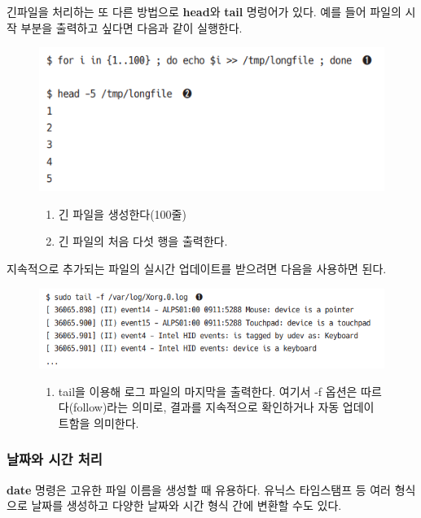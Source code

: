 \begin{flushleft}
    긴파일을 처리하는 또 다른 방법으로 \textbf{head}와 \textbf{tail} 명렁어가 있다.
    예를 들어 파일의 시작 부분을 출력하고 싶다면 다음과 같이 실행한다.
\end{flushleft}

\begin{figure}[h]
    \includegraphics[width=15cm]{resource/3-head-example.png}
    \begin{enumerate}
        \item 긴 파일을 생성한다(100줄)
        \item 긴 파일의 처음 다섯 행을 출력한다.
    \end{enumerate}
\end{figure}

\begin{flushleft}
    지속적으로 추가되는 파일의 실시간 업데이트를 받으려면 다음을 사용하면 된다.
\end{flushleft}

\begin{figure}[h]
    \includegraphics[width=15cm]{resource/3-tail-example.png}
    \begin{enumerate}
        \item tail을 이용해 로그 파일의 마지막을 출력한다.
            여기서 -f 옵션은 따르다(follow)라는 의미로,
            결과를 지속적으로 확인하거나 자동 업데이트함을 의미한다.
    \end{enumerate}
\end{figure}


\subsubsection*{날짜와 시간 처리}
\begin{flushleft}
    \textbf{date} 명령은 고유한 파일 이름을 생성할 때 유용하다.
    유닉스 타임스탬프 등 여러 형식으로 날짜를 생성하고
    다양한 날짜와 시간 형식 간에 변환할 수도 있다.
\end{flushleft}

